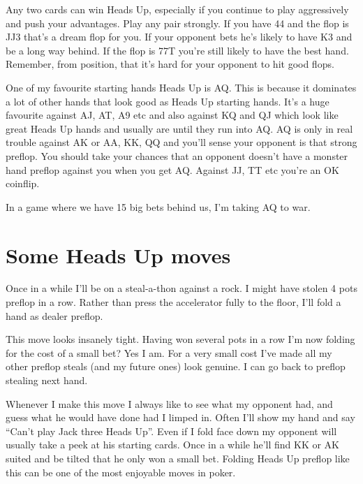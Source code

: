 Any two cards can win Heads Up, especially if you continue
to play aggressively and push your advantages. Play any
pair strongly. If you have 44 and the flop is JJ3 that's
a dream flop for you. If your opponent bets he's likely
to have K3 and be a long way behind. If the flop is 77T
you're still likely to have the best hand. Remember,
from position, that it's hard for your opponent to
hit good flops.

One of my favourite starting hands Heads Up is AQ.
This is because it dominates a lot of other hands
that look good as Heads Up starting hands.
It's a huge favourite against AJ, AT, A9 etc and also
against KQ and QJ which look like great Heads Up hands
and usually are until they run into AQ. AQ is only in
real trouble against AK or AA, KK, QQ and you'll 
sense your opponent is that strong preflop. You should
take your chances that an opponent doesn't have a monster
hand preflop against you when you get AQ. Against JJ, TT
etc you're an OK coinflip.

In a game where we have 15 big bets behind us, I'm
taking AQ to war.

\section{Some Heads Up moves}

Once in a while I'll be on a steal-a-thon against
a rock. I might have stolen 4 pots preflop in a row.
Rather than press the accelerator fully to the floor,
I'll fold a hand as dealer preflop.

This move looks insanely tight. Having won several
pots in a row I'm now folding for the cost of a small bet?
Yes I am. For a very small cost I've made all my other
preflop steals (and my future ones) look genuine. I can go
back to preflop stealing next hand.

Whenever I make this move I always like to see what
my opponent had, and guess what he would have done had
I limped in. Often I'll show my hand and say ``Can't play
Jack three Heads Up''. Even if I fold face down my opponent
will usually take a peek at his starting cards. Once
in a while he'll find KK or AK suited and be tilted
that he only won a small bet. Folding Heads Up preflop
like this can be one of the most enjoyable moves in poker.

